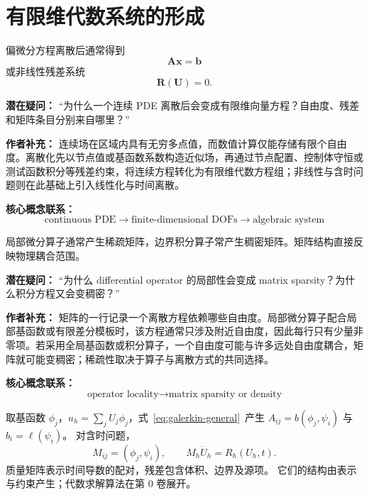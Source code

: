 \section{有限维代数系统的形成}
偏微分方程离散后通常得到
\[
\bm A\bm x=\bm b
\]
或非线性残差系统
\[
\bm R(\bm U)=0.
\]

\begin{authornote}
\textbf{潜在疑问：}
“为什么一个连续 PDE 离散后会变成有限维向量方程？自由度、残差和矩阵条目分别来自哪里？”

\textbf{作者补充：}
连续场在区域内具有无穷多点值，而数值计算仅能存储有限个自由度。离散化先以节点值或基函数系数构造近似场，再通过节点配置、控制体守恒或测试函数积分等残差约束，将连续方程转化为有限维代数方程组；非线性与含时问题则在此基础上引入线性化与时间离散。

\textbf{核心概念联系：}
\[
\text{continuous PDE}
\longrightarrow
\text{finite-dimensional DOFs}
\longrightarrow
\text{algebraic system}
\]
\end{authornote}

局部微分算子通常产生稀疏矩阵，边界积分算子常产生稠密矩阵。矩阵结构直接反映物理耦合范围。

\begin{authornote}
\textbf{潜在疑问：}
“为什么 differential operator 的局部性会变成 matrix sparsity？为什么积分方程又会变稠密？”

\textbf{作者补充：}
矩阵的一行记录一个离散方程依赖哪些自由度。局部微分算子配合局部基函数或有限差分模板时，该方程通常只涉及附近自由度，因此每行只有少量非零项。若采用全局基函数或积分算子，一个自由度可能与许多远处自由度耦合，矩阵就可能变稠密；稀疏性取决于算子与离散方式的共同选择。

\textbf{核心概念联系：}
\[
\text{operator locality}
\longrightarrow
\text{matrix sparsity or density}
\]
\end{authornote}


取基函数 $\phi_j$，$u_h=\sum_jU_j\phi_j$，式~\eqref{eq:galerkin-general}~产生
$A_{ij}=b(\phi_j,\psi_i)$ 与 $b_i=\ell(\psi_i)$。
对含时问题，
\[
M_{ij}=(\phi_j,\psi_i),\qquad M_h\dot U_h=R_h(U_h,t).
\]
质量矩阵表示时间导数的配对，残差包含体积、边界及源项。
它们的结构由表示与约束产生；代数求解算法在第 0 卷展开。
